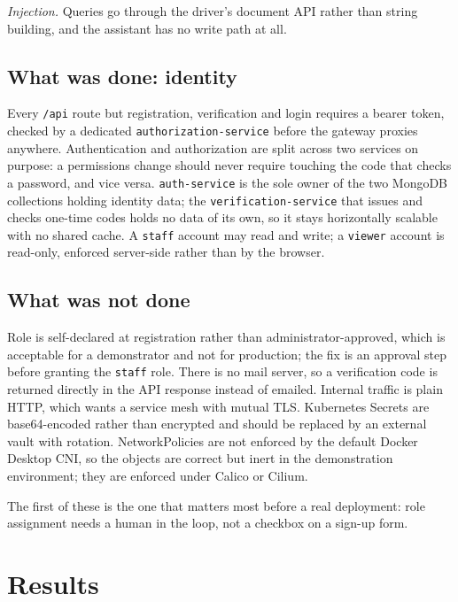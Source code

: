 \documentclass[conference]{IEEEtran}
\begin{document}
\emph{Injection.} Queries go through the driver's document API rather than
string building, and the assistant has no write path at all.

\subsection{What was done: identity}

Every \texttt{/api} route but registration, verification and login requires a
bearer token, checked by a dedicated \texttt{authorization-service} before the
gateway proxies anywhere. Authentication and authorization are split across two
services on purpose: a permissions change should never require touching the
code that checks a password, and vice versa. \texttt{auth-service} is the sole
owner of the two MongoDB collections holding identity data; the
\texttt{verification-service} that issues and checks one-time codes holds no
data of its own, so it stays horizontally scalable with no shared cache. A
\texttt{staff} account may read and write; a \texttt{viewer} account is
read-only, enforced server-side rather than by the browser.

\subsection{What was not done}

Role is self-declared at registration rather than administrator-approved, which
is acceptable for a demonstrator and not for production; the fix is an
approval step before granting the \texttt{staff} role. There is no mail
server, so a verification code is returned directly in the API response
instead of emailed. Internal traffic is plain HTTP, which wants a service mesh
with mutual TLS. Kubernetes Secrets are base64-encoded rather than encrypted
and should be replaced by an external vault with rotation. NetworkPolicies are
not enforced by the default Docker Desktop CNI, so the objects are correct but
inert in the demonstration environment; they are enforced under Calico or
Cilium.

The first of these is the one that matters most before a real deployment: role
assignment needs a human in the loop, not a checkbox on a sign-up form.

\section{Results}
\end{document}

